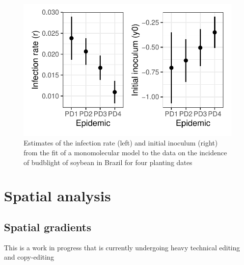 \documentclass[
  letterpaper,
  DIV=11,
  numbers=noendperiod]{scrreprt}
\begin{document}
\begin{figure}[H]

{\centering \includegraphics{temporal-fitting_files/figure-pdf/fig-bud4-1.pdf}

}

\caption{\label{fig-bud4}Estimates of the infection rate (left) and
initial inoculum (right) from the fit of a monomolecular model to the
data on the incidence of budblight of soybean in Brazil for four
planting dates}

\end{figure}

\part{Spatial analysis}

\hypertarget{spatial-gradients}{%
\chapter{Spatial gradients}\label{spatial-gradients}}

\begin{tcolorbox}[enhanced jigsaw, breakable, left=2mm, opacityback=0, rightrule=.15mm, toprule=.15mm, colframe=quarto-callout-note-color-frame, arc=.35mm, colback=white, bottomrule=.15mm, leftrule=.75mm]
\begin{minipage}[t]{5.5mm}
\textcolor{quarto-callout-note-color}{\faInfo}
\end{minipage}%
\begin{minipage}[t]{\textwidth - 5.5mm}

This is a work in progress that is currently undergoing heavy technical
editing and copy-editing

\end{minipage}%
\end{tcolorbox}
\end{document}
